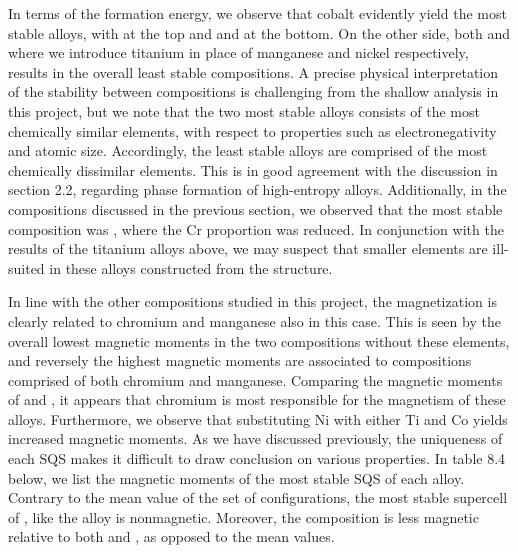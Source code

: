 In terms of the formation energy, we observe that cobalt evidently yield the most stable alloys, with  at the top and and  at the bottom. On the other side, both  and  where we introduce titanium in place of manganese and nickel respectively, results in the overall least stable compositions. A precise physical interpretation of the stability between compositions is challenging from the shallow analysis in this project, but we note that the two most stable alloys consists of the most chemically similar elements, with respect to properties such as electronegativity and atomic size. Accordingly, the least stable alloys are comprised of the most chemically dissimilar elements. This is in good agreement with the discussion in section 2.2, regarding phase formation of high-entropy alloys. Additionally, in the compositions discussed in the previous section, we observed that the most stable composition was , where the Cr proportion was reduced. In conjunction with the results of the titanium alloys above, we may suspect that smaller elements are ill-suited in these alloys constructed from the  structure.   

In line with the other compositions studied in this project, the magnetization is clearly related to chromium and manganese also in this case. This is seen by the overall lowest magnetic moments in the two compositions without these elements, and reversely the highest magnetic moments are associated to compositions comprised of both chromium and manganese. Comparing the magnetic moments of  and , it appears that chromium is most responsible for the magnetism of these alloys. Furthermore, we observe that substituting Ni with either Ti and Co yields increased magnetic moments. As we have discussed previously, the uniqueness of each SQS makes it difficult to draw conclusion on various properties. In table 8.4 below, we list the magnetic moments of the most stable SQS of each alloy. Contrary to the mean value of the set of configurations, the most stable supercell of , like the  alloy is nonmagnetic. Moreover, the  composition is less magnetic relative to both  and , as opposed to the mean values.

